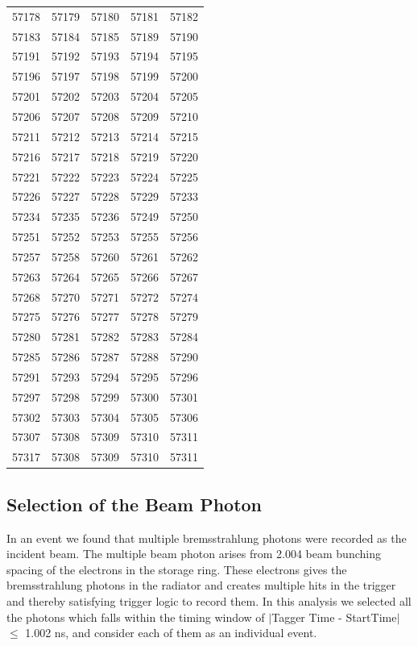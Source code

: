 \documentclass[12pt,a4paper]{amsbook}
\theoremstyle{definition}
\begin{document}
\begin{longtable}{|c|c|c|c|c|}
57178&57179&57180&57181&57182\\ 
57183&57184&57185&57189&57190\\ 
57191&57192&57193&57194&57195\\ 
57196&57197&57198&57199&57200\\ 
57201&57202&57203&57204&57205\\ 
57206&57207&57208&57209&57210\\ 
57211&57212&57213&57214&57215\\ 
57216&57217&57218&57219&57220\\ 
57221&57222&57223&57224&57225\\ 
57226&57227&57228&57229&57233\\ 
57234&57235&57236&57249&57250\\ 
57251&57252&57253&57255&57256\\ 
57257&57258&57260&57261&57262\\ 
57263&57264&57265&57266&57267\\ 
57268&57270&57271&57272&57274\\ 
57275&57276&57277&57278&57279\\ 
57280&57281&57282&57283&57284\\ 
57285&57286&57287&57288&57290\\ 
57291&57293&57294&57295&57296\\ 
57297&57298&57299&57300&57301\\ 
57302&57303&57304&57305&57306\\ 
57307&57308&57309&57310&57311\\ 
57317&57308&57309&57310&57311\\ 
\hline
\end{longtable}

\subsection{Selection of the Beam Photon}

In an event we found that multiple bremsstrahlung photons were recorded as the incident beam. The multiple beam photon arises from 2.004 beam bunching spacing of the electrons in the storage ring. These electrons gives the bremsstrahlung photons in the radiator and creates multiple hits in the trigger and thereby satisfying trigger logic to record them. In this analysis we selected all the  photons which falls within the timing window of $\mid$Tagger Time - StartTime$\mid$ $\leq$ 1.002 ns, and consider each of them as an individual event.
\end{document}
